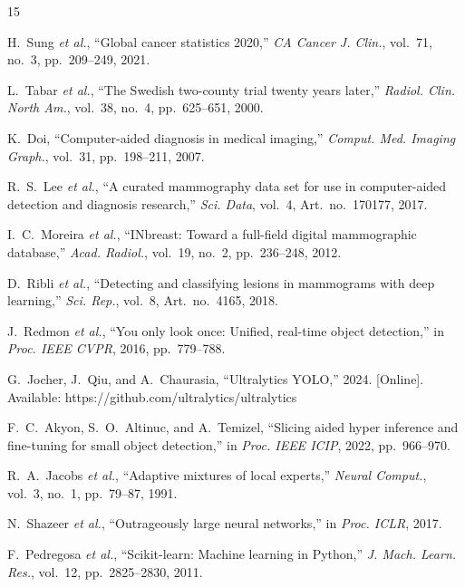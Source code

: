 \documentclass[runningheads]{llncs}
\begin{document}
\begin{thebibliography}{15}
\setlength{\itemsep}{0pt}
\setlength{\parskip}{0pt}

H.~Sung \textit{et al.}, ``Global cancer statistics 2020,''
\textit{CA Cancer J. Clin.}, vol.~71, no.~3, pp.~209--249, 2021.

L.~Tabar \textit{et al.}, ``The Swedish two-county trial twenty years
later,'' \textit{Radiol. Clin. North Am.}, vol.~38, no.~4,
pp.~625--651, 2000.

K.~Doi, ``Computer-aided diagnosis in medical imaging,''
\textit{Comput. Med. Imaging Graph.}, vol.~31, pp.~198--211, 2007.

R.~S.~Lee \textit{et al.}, ``A curated mammography data set for use in
computer-aided detection and diagnosis research,''
\textit{Sci. Data}, vol.~4, Art.~no.~170177, 2017.

I.~C.~Moreira \textit{et al.}, ``INbreast: Toward a full-field digital
mammographic database,'' \textit{Acad. Radiol.}, vol.~19, no.~2,
pp.~236--248, 2012.

D.~Ribli \textit{et al.}, ``Detecting and classifying lesions in
mammograms with deep learning,'' \textit{Sci. Rep.}, vol.~8,
Art.~no.~4165, 2018.

J.~Redmon \textit{et al.}, ``You only look once: Unified, real-time
object detection,'' in \textit{Proc. IEEE CVPR}, 2016, pp.~779--788.

G.~Jocher, J.~Qiu, and A.~Chaurasia, ``Ultralytics YOLO,'' 2024.
[Online]. Available: https://github.com/ultralytics/ultralytics

F.~C.~Akyon, S.~O.~Altinuc, and A.~Temizel, ``Slicing aided hyper
inference and fine-tuning for small object detection,'' in
\textit{Proc. IEEE ICIP}, 2022, pp.~966--970.

R.~A.~Jacobs \textit{et al.}, ``Adaptive mixtures of local experts,''
\textit{Neural Comput.}, vol.~3, no.~1, pp.~79--87, 1991.

N.~Shazeer \textit{et al.}, ``Outrageously large neural networks,''
in \textit{Proc. ICLR}, 2017.

F.~Pedregosa \textit{et al.}, ``Scikit-learn: Machine learning in
Python,'' \textit{J. Mach. Learn. Res.}, vol.~12,
pp.~2825--2830, 2011.


\end{thebibliography}
\end{document}
